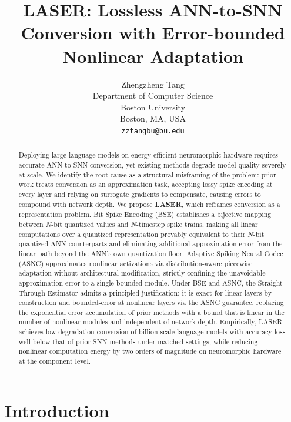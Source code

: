 \documentclass{article}
\title{LASER: Lossless ANN-to-SNN Conversion with Error-bounded Nonlinear Adaptation}
\author{%
  Zhengzheng Tang \\
  Department of Computer Science\\
  Boston University\\
  Boston, MA, USA \\
  \texttt{zztangbu@bu.edu} \\
}
\theoremstyle{plain}
\theoremstyle{definition}
\theoremstyle{remark}
\begin{document}
\maketitle

\begin{abstract}
Deploying large language models on energy-efficient neuromorphic hardware requires
accurate ANN-to-SNN conversion, yet existing methods degrade model quality severely at
scale. We identify the root cause as a structural misframing of the
problem: prior work treats conversion as an approximation task, accepting lossy spike
encoding at every layer and relying on surrogate gradients to compensate, causing
errors to compound with network depth. We propose \textbf{LASER}, which
reframes conversion as a representation problem. Bit Spike Encoding (BSE) establishes
a bijective mapping between $N$-bit quantized values and $N$-timestep spike trains,
making all linear computations over a quantized representation provably equivalent to
their $N$-bit quantized ANN counterparts and eliminating additional approximation error
from the linear path beyond the ANN's own quantization floor. Adaptive Spiking Neural
Codec (ASNC) approximates nonlinear activations via distribution-aware piecewise
adaptation without architectural modification, strictly confining the unavoidable
approximation error to a single bounded module. Under BSE and ASNC, the
Straight-Through Estimator admits a principled justification: it is exact for linear
layers by construction and bounded-error at nonlinear layers via the ASNC guarantee,
replacing the exponential error accumulation of prior methods with a bound that is
linear in the number of nonlinear modules and independent of network depth. Empirically,
LASER achieves low-degradation conversion of billion-scale language models with accuracy
loss well below that of prior SNN methods under matched settings, while reducing
nonlinear computation energy by two orders of magnitude on neuromorphic hardware at the
component level.
\end{abstract}

\section{Introduction}
\label{sec:introduction}
\end{document}

